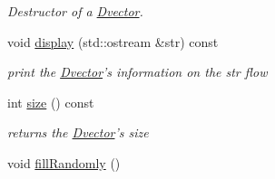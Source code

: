 \begin{DoxyCompactItemize}
\begin{DoxyCompactList}\small\item\em Destructor of a \hyperlink{classDvector}{Dvector}. \end{DoxyCompactList}\item 
void \hyperlink{classDvector_a38e7631a6fc81ca7355b2c7361ceed95}{display} (std\-::ostream \&str) const 
\begin{DoxyCompactList}\small\item\em print the \hyperlink{classDvector}{Dvector}'s information on the str flow \end{DoxyCompactList}\item 
int \hyperlink{classDvector_af92b914997c31751ca7f805f63e0d543}{size} () const 
\begin{DoxyCompactList}\small\item\em returns the \hyperlink{classDvector}{Dvector}'s size \end{DoxyCompactList}\item 
\hypertarget{classDvector_a6fecdca0fbad7f928403597e322234b1}{void \hyperlink{classDvector_a6fecdca0fbad7f928403597e322234b1}{fill\-Randomly} ()}\label{classDvector_a6fecdca0fbad7f928403597e322234b1}


\end{DoxyCompactItemize}
